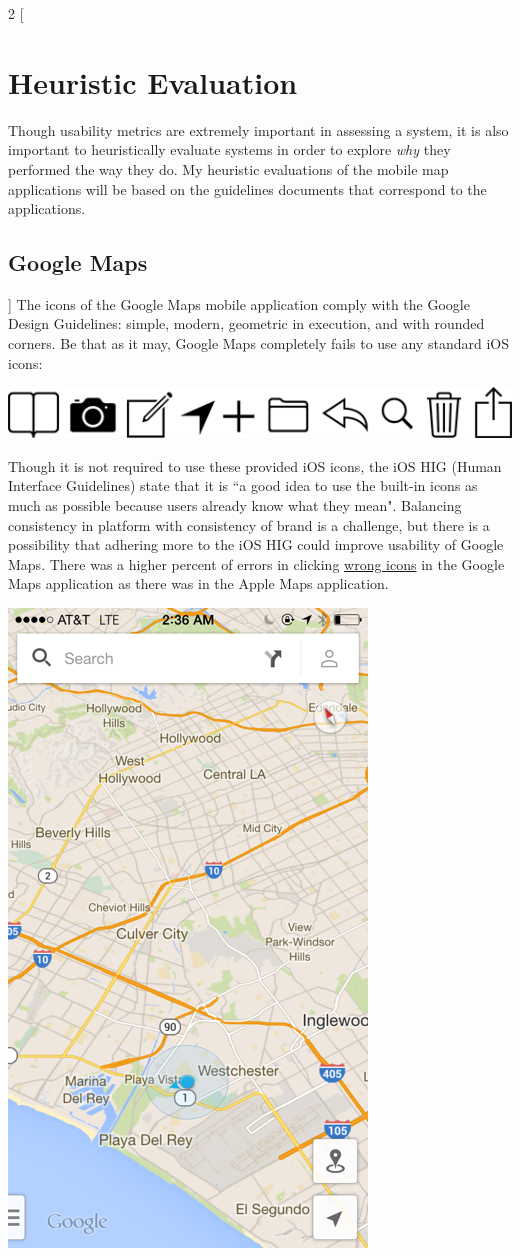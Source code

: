 \documentclass[a4paper; 11pt]{article}
\begin{document}
\begin{multicols}{2}
[
\section{Heuristic Evaluation}
Though usability metrics are extremely important in assessing a system, it is also important to heuristically evaluate systems in order to explore \textit{why} they performed the way they do.
My heuristic evaluations of the mobile map applications will be based on the guidelines documents that correspond to the applications.
\subsection{Google Maps}
]
The icons of the Google Maps mobile application comply with the Google Design Guidelines\cite{Google}: simple, modern, geometric in execution, and with rounded corners. Be that as it may, Google Maps completely fails to use any standard iOS icons:
\par
\noindent
\includegraphics[width=.45\textwidth]{ios-bar-icons.png}
\par
\noindent
Though it is not required to use these provided iOS icons, the iOS HIG (Human Interface Guidelines) state that it is ``a good idea to use the built-in icons as much as possible because users already know what they mean".\cite{Apple} Balancing consistency in platform with consistency of brand is a challenge, but there is a possibility that adhering more to the iOS HIG could improve usability of Google Maps. There was a higher percent of errors in clicking \underline{wrong icons} in the Google Maps application as there was in the Apple Maps application. 

\includegraphics[width=.5\textwidth]{google-maps.png}


\end{multicols}
\end{document}
